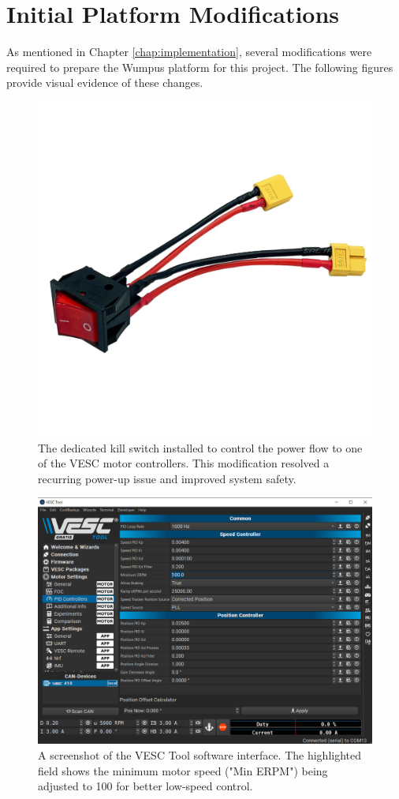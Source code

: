 
\section{Initial Platform Modifications}
\label{sec:appendix_platform_mods}
As mentioned in Chapter \ref{chap:implementation}, several modifications were required to prepare the Wumpus platform for this project. The following figures provide visual evidence of these changes.

\begin{figure}[h!]
    \centering
    \includegraphics[width=0.4\linewidth]{figures/killswitch.PNG}
    \caption[VESC Motor Controller Kill Switch.]
    {The dedicated kill switch installed to control the power flow to one of the VESC motor controllers. This modification resolved a recurring power-up issue and improved system safety.}
    \label{fig:appendix_killswitch}
\end{figure}

\begin{figure}[h!]
    \centering
    \includegraphics[width=0.8\linewidth]{figures/vesctool.PNG}
    \caption[VESC Tool Software Interface for Motor Configuration.]
    {A screenshot of the VESC Tool software interface. The highlighted field shows the minimum motor speed ("Min ERPM") being adjusted to 100 for better low-speed control.}
    \label{fig:appendix_vesc_tool}
\end{figure}

